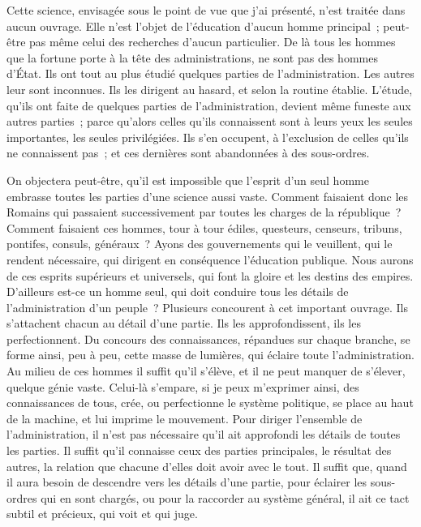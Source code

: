 \documentclass[french,twoside]{book} %
\begin{document}
Cette science, envisagée sous le point de vue que j’ai présenté, n’est traitée dans aucun ouvrage. Elle n’est l’objet de l’éducation d’aucun homme principal ; peut-être pas même celui des recherches d’aucun particulier. De là tous les hommes que la fortune porte à la tête des administrations, ne sont pas des hommes d’État. Ils ont tout au plus étudié quelques parties de l’administration. Les autres leur sont inconnues. Ils les dirigent au hasard, et selon la routine établie. L’étude, qu’ils ont faite de quelques parties de l’administration, devient même funeste aux autres parties ; parce qu’alors celles qu’ils connaissent sont à leurs yeux les seules importantes, les seules privilégiées. Ils s’en occupent, à l’exclusion de celles qu’ils ne connaissent pas ; et ces dernières sont abandonnées à des sous-ordres.\par
On objectera peut-être, qu’il est impossible que l’esprit d’un seul homme embrasse toutes les parties d’une science aussi vaste. Comment faisaient donc les Romains qui passaient successivement par toutes les charges de la république ? Comment faisaient ces hommes, tour à tour édiles, questeurs, censeurs, tribuns, pontifes, consuls, généraux ? Ayons des gouvernements qui le veuillent, qui le rendent nécessaire, qui dirigent en conséquence l’éducation publique. Nous aurons de ces esprits supérieurs et universels, qui font la gloire et les destins des empires. D’ailleurs est-ce un homme seul, qui doit conduire tous les détails de l’administration d’un peuple ? Plusieurs concourent à cet important ouvrage. Ils s’attachent chacun au détail d’une partie. Ils les approfondissent, ils les perfectionnent. Du concours des connaissances, répandues sur chaque branche, se forme ainsi, peu à peu, cette masse de lumières, qui éclaire toute l’administration. Au milieu de ces hommes il suffit qu’il s’élève, et il ne peut manquer de s’élever, quelque génie vaste. Celui-là s’empare, si je peux m’exprimer ainsi, des connaissances de tous, crée, ou perfectionne le système politique, se place au haut de la machine, et lui imprime le mouvement. Pour diriger l’ensemble de l’administration, il n’est pas nécessaire qu’il ait approfondi les détails de toutes les parties. Il suffit qu’il connaisse ceux des parties principales, le résultat des autres, la relation que chacune d’elles doit avoir avec le tout. Il suffit que, quand il aura besoin de descendre vers les détails d’une partie, pour éclairer les sous-ordres qui en sont chargés, ou pour la raccorder au système général, il ait ce tact subtil et précieux, qui voit et qui juge.\par
\end{document}
